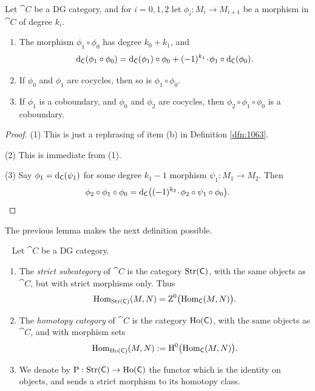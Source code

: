 \begin{lem} \label{lem:1211}
Let $\cat{C}$ be a DG category, and for $i = 0, 1, 2$ let 
$\phi_i : M_{i} \to M_{i + 1}$ be a morphism in $\cat{C}$ of degree $k_i$.  
\begin{enumerate}
\item The morphism $\phi_1 \circ \phi_0$ has degree $k_0 + k_1$, and 
\[ \mathrm{d}_{\operatorname{\mathsf{C}}}(\phi_1 \circ \phi_0) = 
\mathrm{d}_{\operatorname{\mathsf{C}}}(\phi_1) \circ \phi_0 +
(-1)^{k_1} \mspace{1.5mu}{\cdot}\mspace{1.5mu} \phi_1 \circ \mathrm{d}_{\operatorname{\mathsf{C}}}(\phi_0) . \]

\item If $\phi_0$ and $\phi_1$ are cocycles, then so is $\phi_1 \circ \phi_0$.

\item If  $\phi_1$ is a coboundary, and $\phi_0$ and $\phi_2$ are cocycles, 
then $\phi_2 \circ \phi_1 \circ \phi_0$ is a coboundary.
\end{enumerate}
\end{lem}

\begin{proof}
(1) This is just a rephrasing of item (b) in Definition \ref{dfn:1063}. 

\medskip \noindent 
(2) This is immediate from (1). 

\medskip \noindent 
(3) Say $\phi_1 = \mathrm{d}_{\operatorname{\mathsf{C}}}(\psi_1)$ for some degree $k_1 - 1$ morphism 
$\psi_1 : M_{1} \to M_2$. Then 
\[ \phi_2 \circ \phi_1 \circ \phi_0 = 
\mathrm{d}_{\operatorname{\mathsf{C}}} \bigl( (-1)^{k_2} \mspace{1.5mu}{\cdot}\mspace{1.5mu} \phi_2 \circ \psi_1 \circ \phi_0 \bigr) .
\qedhere \]
\end{proof}

The previous lemma makes the next definition possible. 

\begin{dfn} \label{dfn:1212} \mbox{ }
Let $\cat{C}$ be a DG category.
\begin{enumerate}
\item The {\em strict subcategory}%
%
of $\cat{C}$ is the category 
$\operatorname{Str}(\operatorname{\mathsf{C}})$, with the same objects as 
$\cat{C}$, but with strict morphisms only. Thus 
\[ \operatorname{Hom}_{\operatorname{Str}(\operatorname{\mathsf{C}})}(M, N) = 
\operatorname{Z}^0 \bigl( \operatorname{Hom}_{\operatorname{\mathsf{C}}}(M, N) \bigr) . \]

\item The {\em homotopy category}%
of $\cat{C}$ is the category 
$\operatorname{Ho}(\operatorname{\mathsf{C}})$, with the same objects as $\cat{C}$, 
and with morphism sets 
\[  \operatorname{Hom}_{\operatorname{Ho}(\operatorname{\mathsf{C}})}(M, N) := 
\operatorname{H}^0 \bigl( \operatorname{Hom}_{\operatorname{\mathsf{C}}}(M, N) \bigr) . \]

\item We denote by 
$\operatorname{P} : \operatorname{Str}(\operatorname{\mathsf{C}}) \to \operatorname{Ho}(\operatorname{\mathsf{C}})$
the functor which is  the identity on objects, and sends a strict morphism to 
its homotopy class. 
\end{enumerate}
\end{dfn}


